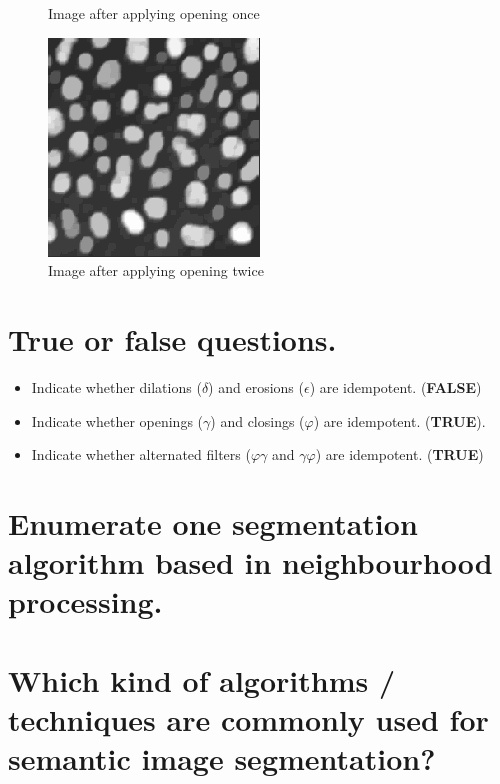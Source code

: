 \documentclass{article}
\begin{document}
\begin{figure}[!h]
  \caption{Image after applying opening once}\label{fig:awesome_image2}
\endminipage\hfill
{}%
  \includegraphics[width=\linewidth]{report/exam/images/exercise_05a_output-02.png}
  \caption{Image after applying opening twice}\label{fig:awesome_image3}
\endminipage
\end{figure}

\section{True or false questions.}

\begin{itemize}
    \item Indicate whether dilations ($\delta$) and erosions ($\epsilon$) are idempotent. (\textbf{FALSE})
    \item Indicate whether openings ($\gamma$) and closings ($\varphi$) are idempotent. (\textbf{TRUE}).
    \item Indicate whether alternated filters ($\varphi\gamma$ and $\gamma\varphi$) are idempotent. (\textbf{TRUE})
\end{itemize}

\section{Enumerate one segmentation algorithm based in neighbourhood processing.}

\section{Which kind of algorithms / techniques are commonly used for semantic image segmentation?}
\end{document}
